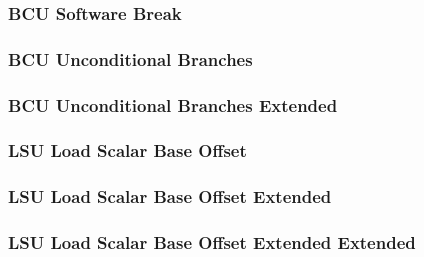 

\subsubsection[{\small BCU Software Break}]{BCU Software Break} \label{sec:format-BCU-BREAK}



\subsubsection[{\small BCU Unconditional Branches}]{BCU Unconditional Branches} \label{sec:format-BCU-UB}



\subsubsection[{\small BCU Unconditional Branches Extended}]{BCU Unconditional Branches Extended} \label{sec:format-BCU-UB.X}



\subsubsection[{\small LSU Load Scalar Base Offset}]{LSU Load Scalar Base Offset} \label{sec:format-LSU-LSBO}



\subsubsection[{\small LSU Load Scalar Base Offset Extended}]{LSU Load Scalar Base Offset Extended} \label{sec:format-LSU-LSBO.X}



\subsubsection[{\small LSU Load Scalar Base Offset Extended Extended}]{LSU Load Scalar Base Offset Extended Extended} \label{sec:format-LSU-LSBO.Y}

